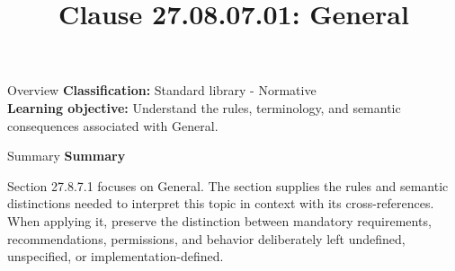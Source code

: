 \documentclass[10pt,letterpaper]{article}
\title{Clause 27.08.07.01: General}
\author{}
\date{}
\begin{document}
\maketitle
\begin{CornellOverviewBox}{Overview}
\textbf{Classification:} Standard library - Normative\\[2pt]
\textbf{Learning objective:} Understand the rules, terminology, and semantic consequences associated with General.
\end{CornellOverviewBox}\begin{CornellSummaryBox}{Summary}
{\sffamily\bfseries\color{Accent} Summary}\par\vspace{3pt}Section 27.8.7.1 focuses on General. The section supplies the rules and semantic distinctions needed to interpret this topic in context with its cross-references. When applying it, preserve the distinction between mandatory requirements, recommendations, permissions, and behavior deliberately left undefined, unspecified, or implementation-defined.
\end{CornellSummaryBox}
\end{document}
